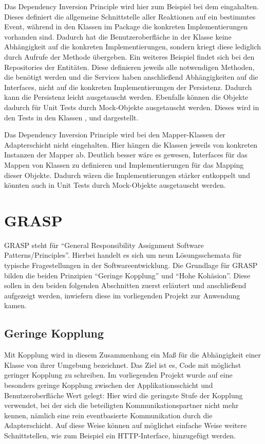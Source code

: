 Das Dependency Inversion Principle wird hier zum Beispiel bei dem  eingahalten. Dieses definiert die allgemeine Schnittstelle aller Reaktionen auf ein bestimmtes Event, während in den Klassen im Package      die konkreten Implementierungen vorhanden sind. Dadurch hat die Benutzeroberfläche in der Klasse  keine Abhängigkeit auf die konkreten Implementierungen, sondern kriegt diese lediglich durch Aufrufe der Methode  übergeben. Ein weiteres Beispiel findet sich bei den Repositories der Entitäten. Diese definieren jeweils alle notwendigen Methoden, die benötigt werden und die Services haben anschließend Abhängigkeiten auf die Interfaces, nicht auf die konkreten Implementierungen der Persistenz. Dadurch kann die Persistenz leicht ausgetauscht werden. Ebenfalls können die Objekte dadurch für Unit Tests durch Mock-Objekte ausgetauscht werden. Dieses wird in den Tests in den Klassen ,  und  dargestellt.

Das Dependency Inversion Principle wird bei den Mapper-Klassen der Adapterschicht nicht eingehalten. Hier hängen die Klassen jeweils von konkreten Instanzen der Mapper ab. Deutlich besser wäre es gewesen, Interfaces für das Mappen von Klassen zu definieren und Implementierungen für das Mapping dieser Objekte. Dadurch wären die Implementierungen stärker entkoppelt und könnten auch in Unit Tests durch Mock-Objekte ausgetauscht werden.

\section{GRASP}
GRASP steht für \enquote{General Responsibility Assignment Software Patterns/Principles}. Hierbei handelt es sich um neun Lösungsschemata für typische Fragestellungen in der Softwareentwicklung. Die Grundlage für GRASP bilden die beiden Prinzipien \enquote{Geringe Kopplung} und \enquote{Hohe Kohäsion}. Diese sollen in den beiden folgenden Abschnitten zuerst erläutert und anschließend aufgezeigt werden, inwiefern diese im vorliegenden Projekt zur Anwendung kamen.

\subsection{Geringe Kopplung}
Mit Kopplung wird in diesem Zusammenhang ein Maß für die Abhängigkeit einer Klasse von ihrer Umgebung bezeichnet. Das Ziel ist es, Code mit möglichst geringer Kopplung zu schreiben. Im vorliegenden Projekt wurde auf eine besonders geringe Kopplung zwischen der Applikationsschicht und Benutzeroberfläche Wert gelegt: Hier wird die geringste Stufe der Kopplung verwendet, bei der sich die beteiligten Kommunikationspartner nicht mehr kennen, nämlich eine rein eventbasierte Kommunikation durch die Adapterschicht. Auf diese Weise können auf möglichst einfache Weise weitere Schnittstellen, wie zum Beispiel ein HTTP-Interface, hinzugefügt werden.

